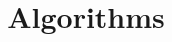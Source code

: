 \documentclass[10pt]{article}
\title{\vspace{-4ex}\Large{Algorithms}}
\author{}
\date{}
\begin{document}
\begin{landscape}
\begin{multicols}{2}

\maketitle
\vspace{-13ex}
\tableofcontents
\pagestyle{fancy}



\end{multicols}
\end{landscape}
\end{document}
